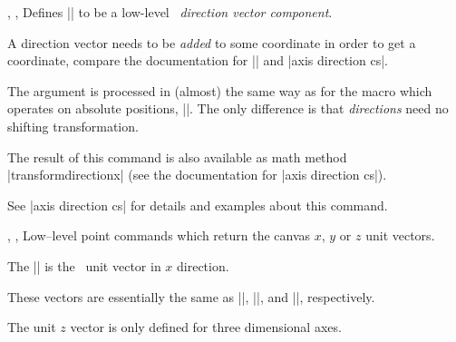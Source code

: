 \begin{commandlist}{%
	\pgfplotstransformdirectionx{},%
	\pgfplotstransformdirectiony{},%
	\pgfplotstransformdirectionz{}}
	Defines |\pgfmathresult| to be a low-level \PGF\ \emph{direction vector component}.

	A direction vector needs to be \emph{added} to some coordinate in order to get a coordinate, compare the documentation for |\pgfplotspointaxisdirectionxy| and |axis direction cs|.

	The argument  is processed in (almost) the same way as for the macro which operates on absolute positions, |\pgfplotstransformcoordinatex|. The only difference is that \emph{directions} need no shifting transformation. 

	The result of this command is also available as math method |transformdirectionx| (see the documentation for |axis direction cs|).

	See |axis direction cs| for details and examples about this command.
\end{commandlist}

% 
% 


\begin{commandlist}{%
	\pgfplotspointunitx,%
	\pgfplotspointunity,%
	\pgfplotspointunitz}%
	Low--level point commands which return the canvas $x$, $y$ or $z$ unit vectors.

	The |\pgfplotspointunitx| is the \pgfname\ unit vector in $x$ direction.

	These vectors are essentially the same as ||, ||, and ||, respectively.

	The unit $z$ vector is only defined for three dimensional axes.
\end{commandlist}

